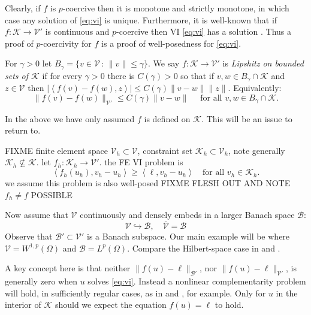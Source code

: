 \documentclass[hidelinks,onefignum,onetabnum,final]{siamart220329}  %
\newcommand{\cB}{\mathcal{B}}
\newcommand{\cK}{\mathcal{K}}
\newcommand{\cV}{\mathcal{V}}
\newcommand{\ip}[2]{\left<#1,#2\right>}
\begin{document}
Clearly, if $f$ is $p$-coercive then it is monotone and strictly monotone, in which case any solution of \eqref{eq:vi} is unique.  Furthermore, it is well-known that if $f:\cK \to \cV'$ is continuous and $p$-coercive then VI \eqref{eq:vi} has a solution \cite[Corollary III.1.8]{KinderlehrerStampacchia1980}.  Thus a proof of $p$-coercivity for $f$ is a proof of well-posedness for \eqref{eq:vi}.


\begin{definition}  For $\gamma>0$ let $B_\gamma = \{v\in \cV\,:\,\|v\|\le \gamma\}$.  We say $f:\cK \to \cV'$ is \emph{Lipshitz on bounded sets of $\cK$} if for every $\gamma>0$ there is $C(\gamma)>0$ so that if $v,w \in B_\gamma \cap \cK$ and $z\in\cV$ then $|\ip{f(v)-f(w)}{z}| \le C(\gamma) \|v-w\| \|z\|$.  Equivalently:
\begin{equation}
\|f(v)-f(w)\|_{\cV'} \le C(\gamma) \|v-w\| \quad \text{ for all } v,w \in B_\gamma \cap \cK.  \label{eq:liponbounded}
\end{equation}
\end{definition}

In the above we have only assumed $f$ is defined on $\cK$.  This will be an issue to return to.

FIXME finite element space $\cV_h \subset \cV$, constraint set $\cK_h\subset \cV_h$, note generally $\cK_h \nsubseteq \cK$.  let $f_h:\cK_h\to\cV'$.  the FE VI problem is
\begin{equation}
\ip{f_h(u_h)}{v_h-u_h} \ge \ip{\ell}{v_h-u_h} \quad \text{for all } v_h\in \cK_h. \label{eq:fe:vi}
\end{equation}
we assume this problem is also well-posed FIXME FLESH OUT AND NOTE $f_h\ne f$ POSSIBLE

Now assume that $\cV$ continuously and densely embeds in a larger Banach space $\cB$:
\begin{equation}
\cV \hookrightarrow \cB, \quad \overline{\cV} = \cB
\end{equation}
Observe that $\cB' \subset \cV'$ is a Banach subspace.  Our main example will be where $\cV=W^{1,p}(\Omega)$ and $\cB=L^p(\Omega)$.  Compare the Hilbert-space case in \cite{Falk1974} and \cite[section 5.1]{Ciarlet2002}.

A key concept here is that neither $\|f(u)-\ell\|_{\cB'}$, nor $\|f(u)-\ell\|_{\cV'}$, is generally zero when $u$ solves \eqref{eq:vi}.  Instead a nonlinear complementarity problem will hold, in sufficiently regular cases, as in \cite[Exercise 5.1.1]{Ciarlet2002}  and \cite[section 7]{BuelerFarrell2024}, for example.  Only for $u$ in the interior of $\cK$ should we expect the equation $f(u)=\ell$ to hold.
\end{document}

